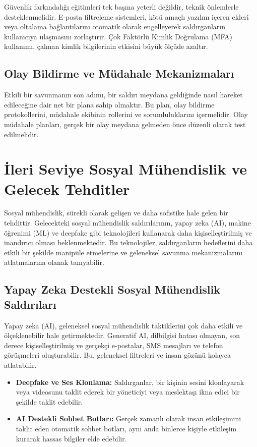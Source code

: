 Güvenlik farkındalığı eğitimleri tek başına yeterli değildir, teknik önlemlerle desteklenmelidir. E-posta filtreleme sistemleri, kötü amaçlı yazılım içeren ekleri veya oltalama bağlantılarını otomatik olarak engelleyerek saldırganların kullanıcıya ulaşmasını zorlaştırır. Çok Faktörlü Kimlik Doğrulama (MFA) kullanımı, çalınan kimlik bilgilerinin etkisini büyük ölçüde azaltır.

\subsection{Olay Bildirme ve Müdahale Mekanizmaları}

Etkili bir savunmanın son adımı, bir saldırı meydana geldiğinde nasıl hareket edileceğine dair net bir plana sahip olmaktır. Bu plan, olay bildirme protokollerini, müdahale ekibinin rollerini ve sorumluluklarını içermelidir. Olay müdahale planları, gerçek bir olay meydana gelmeden önce düzenli olarak test edilmelidir.

\section{İleri Seviye Sosyal Mühendislik ve Gelecek Tehditler}

Sosyal mühendislik, sürekli olarak gelişen ve daha sofistike hale gelen bir tehdittir. Gelecekteki sosyal mühendislik saldırılarının, yapay zeka (AI), makine öğrenimi (ML) ve deepfake gibi teknolojileri kullanarak daha kişiselleştirilmiş ve inandırıcı olması beklenmektedir. Bu teknolojiler, saldırganların hedeflerini daha etkili bir şekilde manipüle etmelerine ve geleneksel savunma mekanizmalarını atlatmalarına olanak tanıyabilir.

\subsection{Yapay Zeka Destekli Sosyal Mühendislik Saldırıları}

Yapay zeka (AI), geleneksel sosyal mühendislik taktiklerini çok daha etkili ve ölçeklenebilir hale getirmektedir. Generatif AI, dilbilgisi hatası olmayan, son derece kişiselleştirilmiş ve gerçekçi e-postalar, SMS mesajları ve telefon görüşmeleri oluşturabilir. Bu, geleneksel filtreleri ve insan gözünü kolayca atlatabilir.
\begin{itemize}
    \item \textbf{Deepfake ve Ses Klonlama:} Saldırganlar, bir kişinin sesini klonlayarak veya videosunu taklit ederek bir yöneticiyi veya meslektaşı ikna edici bir şekilde taklit edebilir.
    \item \textbf{AI Destekli Sohbet Botları:} Gerçek zamanlı olarak insan etkileşimini taklit eden otomatik sohbet botları, aynı anda binlerce kişiyle etkileşim kurarak hassas bilgiler elde edebilir.
\end{itemize}

